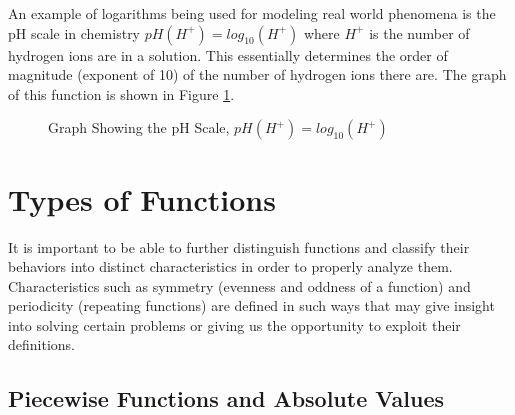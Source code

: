 \begin{example}
    An example of logarithms being used for modeling real world phenomena is the pH scale in chemistry $pH(H^+) = log_{10}(H^+)$ where $H^+$ is the number of hydrogen ions are in a solution. This essentially determines the order of magnitude (exponent of 10) of the number of hydrogen ions there are. The graph of this function is shown in Figure \ref{fig:pHgraph}.

    \begin{figure}
        \centering
        \caption{Graph Showing the pH Scale, $pH(H^+) = log_{10}(H^+)$}
        \label{fig:pHgraph}
    \end{figure}

\end{example}

\section{Types of Functions}\label{sect:types of functions}

It is important to be able to further distinguish functions and classify their behaviors into distinct characteristics in order to properly analyze them.
Characteristics such as symmetry (evenness and oddness of a function) and periodicity (repeating functions) are defined in such ways that may give insight into solving certain problems or giving us the opportunity to exploit their definitions.

\subsection{Piecewise Functions and Absolute Values}\label{sect:piecewise functions and absolute values}


